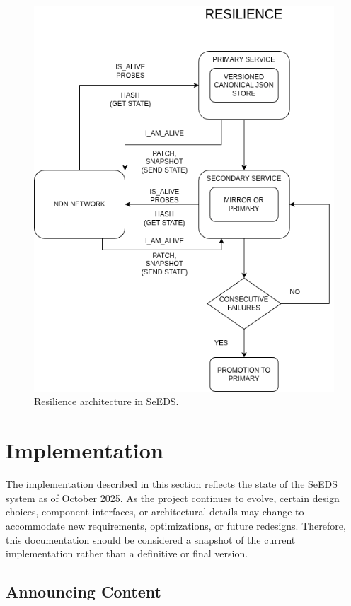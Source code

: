 \documentclass{article}
\begin{document}
\begin{figure}[H]
    \centering
    \includegraphics[width=0.8\linewidth]{images/resilience_seeds.png}
    \caption{Resilience architecture in SeEDS.}
    \label{fig:resilience_architecture}
\end{figure}

\section{Implementation}

The implementation described in this section reflects the state of the SeEDS system as of October 2025. As the project continues to evolve, certain design choices, component interfaces, or architectural details may change to accommodate new requirements, optimizations, or future redesigns. Therefore, this documentation should be considered a snapshot of the current implementation rather than a definitive or final version.


\subsection{Announcing Content}
\end{document}
